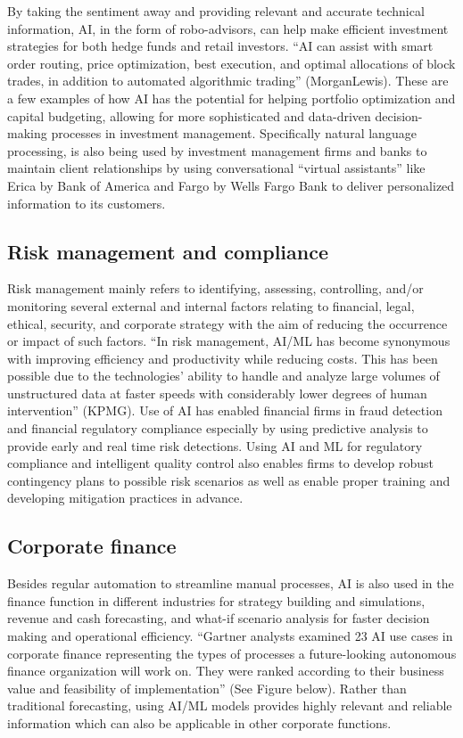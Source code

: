 \documentclass[
]{article}
\begin{document}
By taking the sentiment away and providing relevant and accurate technical information, AI, in the form of robo-advisors, can help make efficient investment strategies for both hedge funds and retail investors. ``AI can assist with smart order routing, price optimization, best execution, and optimal allocations of block trades, in addition to automated algorithmic trading'' (MorganLewis). These are a few examples of how AI has the potential for helping portfolio optimization and capital budgeting, allowing for more sophisticated and data-driven decision-making processes in investment management. Specifically natural language processing, is also being used by investment management firms and banks to maintain client relationships by using conversational ``virtual assistants'' like Erica by Bank of America and Fargo by Wells Fargo Bank to deliver personalized information to its customers.

\hypertarget{risk-management-and-compliance}{%
\subsection{Risk management and compliance}\label{risk-management-and-compliance}}

Risk management mainly refers to identifying, assessing, controlling, and/or monitoring several external and internal factors relating to financial, legal, ethical, security, and corporate strategy with the aim of reducing the occurrence or impact of such factors. ``In risk management, AI/ML has become synonymous with improving efficiency and productivity while reducing costs. This has been possible due to the technologies' ability to handle and analyze large volumes of unstructured data at faster speeds with considerably lower degrees of human intervention'' (KPMG). Use of AI has enabled financial firms in fraud detection and financial regulatory compliance especially by using predictive analysis to provide early and real time risk detections. Using AI and ML for regulatory compliance and intelligent quality control also enables firms to develop robust contingency plans to possible risk scenarios as well as enable proper training and developing mitigation practices in advance.

\hypertarget{corporate-finance}{%
\subsection{Corporate finance}\label{corporate-finance}}

Besides regular automation to streamline manual processes, AI is also used in the finance function in different industries for strategy building and simulations, revenue and cash forecasting, and what-if scenario analysis for faster decision making and operational efficiency. ``Gartner analysts examined 23 AI use cases in corporate finance representing the types of processes a future-looking autonomous finance organization will work on. They were ranked according to their business value and feasibility of implementation'' (See Figure below). Rather than traditional forecasting, using AI/ML models provides highly relevant and reliable information which can also be applicable in other corporate functions.
\end{document}
